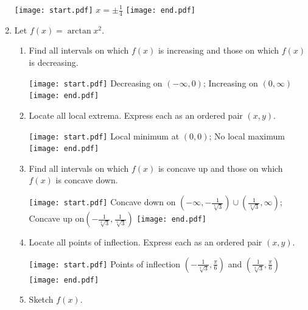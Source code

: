 \documentclass[12pt]{article}
\begin{document}
\begin{enumerate}
\texttt{[image: start.pdf]}
{{$x=\pm\frac{1}{4}$}}
\texttt{[image: end.pdf]}


\item Let $f(x)=\arctan{x^2}$.

\begin{enumerate}

\item Find all intervals on which $f(x)$ is increasing and those on which $f(x)$ is decreasing.

\texttt{[image: start.pdf]}
{Decreasing on $(-\infty,0)$; Increasing on $(0,\infty)$}
\texttt{[image: end.pdf]}


\item Locate all local extrema.  Express each as an ordered pair $(x,y)$.

\texttt{[image: start.pdf]}
{Local minimum at $(0,0)$; No local maximum}
\texttt{[image: end.pdf]}


\item Find all intervals on which $f(x)$ is concave up and those on which $f(x)$ is concave down.

\texttt{[image: start.pdf]}
{Concave down on $\left(-\infty,-\frac{1}{\sqrt[4]{3}}\right)\cup\left(\frac{1}{\sqrt[4]{3}},\infty\right)$; Concave up on$\left(-\frac{1}{\sqrt[4]{3}},\frac{1}{\sqrt[4]{3}}\right)$}
\texttt{[image: end.pdf]}


\item Locate all points of inflection.  Express each as an ordered pair $(x,y)$.

\texttt{[image: start.pdf]}
{Points of inflection $\left(-\frac{1}{\sqrt[4]{3}},\frac{\pi}{6}\right)$ and $\left(\frac{1}{\sqrt[4]{3}},\frac{\pi}{6}\right)$}
\texttt{[image: end.pdf]}


\newpage
\item Sketch $f(x)$.


\end{enumerate}
\end{enumerate}
\end{document}
